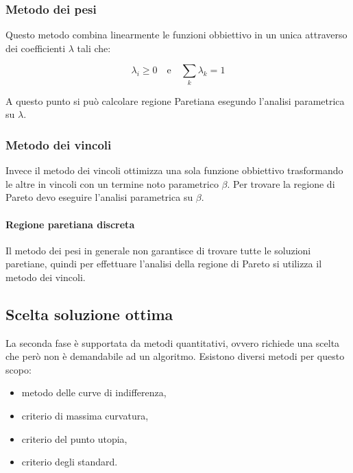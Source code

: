 \subsubsection{Metodo dei pesi}
Questo metodo combina linearmente le funzioni obbiettivo in un unica attraverso dei coefficienti $\lambda$ tali che:

\begin{equation*}
	\lambda_i \geq 0 \quad \text{e} \quad \sum_k \lambda_k = 1
\end{equation*}

A questo punto si può calcolare regione Paretiana esegundo l'analisi parametrica su $\lambda$. 

\subsubsection{Metodo dei vincoli}
Invece il metodo dei vincoli ottimizza una sola funzione obbiettivo trasformando le altre in vincoli con un termine noto parametrico $\beta$. Per trovare la regione di Pareto devo eseguire l'analisi parametrica su $\beta$.

\paragraph{Regione paretiana discreta}
Il metodo dei pesi in generale non garantisce di trovare tutte le soluzioni paretiane, quindi per effettuare l'analisi della regione di Pareto si utilizza il metodo dei vincoli.

\subsection{Scelta soluzione ottima}
La seconda fase è supportata da metodi quantitativi, ovvero richiede una scelta che però non è demandabile ad un algoritmo.
Esistono diversi metodi per questo scopo:

\begin{itemize}
	\item metodo delle curve di indifferenza,
	\item criterio di massima curvatura,
	\item criterio del punto utopia,
	\item criterio degli standard.
\end{itemize}
